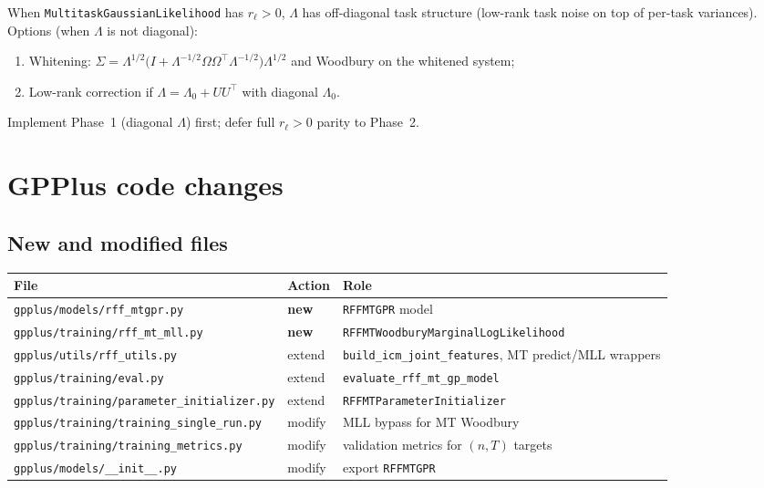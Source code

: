 \documentclass[11pt]{article}
\theoremstyle{plain}
\newcommand{\Sig}{\Sigma}
\newcommand{\Om}{\Omega}
\begin{document}
When \texttt{MultitaskGaussianLikelihood} has $r_\ell > 0$, $\Lambda$ has off-diagonal
task structure (low-rank task noise on top of per-task variances).
Options (when $\Lambda$ is not diagonal):
\begin{enumerate}[nosep]
  \item Whitening: $\Sig = \Lambda^{1/2}\bigl(I + \Lambda^{-1/2}\Om\Om^\top\Lambda^{-1/2}\bigr)\Lambda^{1/2}$
        and Woodbury on the whitened system;
  \item Low-rank correction if $\Lambda = \Lambda_0 + U U^\top$ with diagonal $\Lambda_0$.
\end{enumerate}
Implement Phase~1 (diagonal $\Lambda$) first; defer full $r_\ell > 0$ parity to Phase~2.

\section{GPPlus code changes}

\subsection{New and modified files}

\begin{center}
\renewcommand{\arraystretch}{1.25}
\begin{tabular}{@{}llp{}@{}}
\toprule
\textbf{File} & \textbf{Action} & \textbf{Role} \\
\midrule
\texttt{gpplus/models/rff\_mtgpr.py} & \textbf{new} & \texttt{RFFMTGPR} model \\
\texttt{gpplus/training/rff\_mt\_mll.py} & \textbf{new} & \texttt{RFFMTWoodburyMarginalLogLikelihood} \\
\texttt{gpplus/utils/rff\_utils.py} & extend & \texttt{build\_icm\_joint\_features}, MT predict/MLL wrappers \\
\texttt{gpplus/training/eval.py} & extend & \texttt{evaluate\_rff\_mt\_gp\_model} \\
\texttt{gpplus/training/parameter\_initializer.py} & extend & \texttt{RFFMTParameterInitializer} \\
\texttt{gpplus/training/training\_single\_run.py} & modify & MLL bypass for MT Woodbury \\
\texttt{gpplus/training/training\_metrics.py} & modify & validation metrics for $(n,T)$ targets \\
\texttt{gpplus/models/\_\_init\_\_.py} & modify & export \texttt{RFFMTGPR} \\
\bottomrule
\end{tabular}
\end{center}
\end{document}
